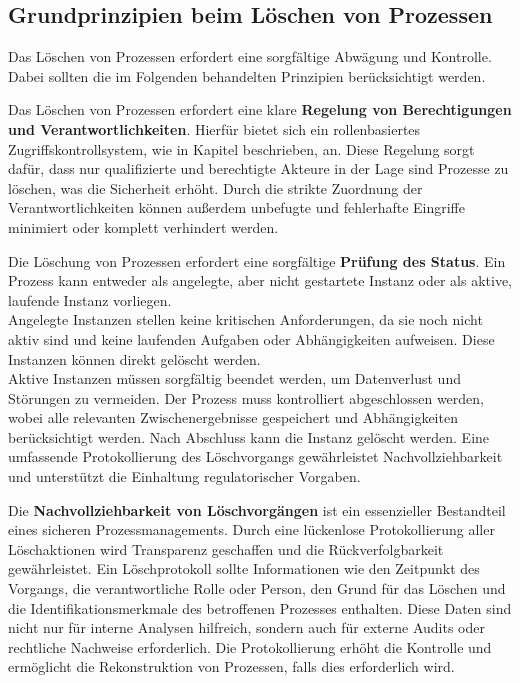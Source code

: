 \subsection*{Grundprinzipien beim Löschen von Prozessen}
Das Löschen von Prozessen erfordert eine sorgfältige Abwägung und Kontrolle. Dabei sollten die im Folgenden behandelten Prinzipien berücksichtigt werden.

Das Löschen von Prozessen erfordert eine klare \textbf{Regelung von Berechtigungen und Verantwortlichkeiten}. Hierfür bietet sich ein rollenbasiertes Zugriffskontrollsystem, wie in Kapitel  beschrieben, an. Diese Regelung sorgt dafür, dass nur qualifizierte und berechtigte Akteure in der Lage sind Prozesse zu löschen, was die Sicherheit erhöht. Durch die strikte Zuordnung der Verantwortlichkeiten können außerdem unbefugte und fehlerhafte Eingriffe minimiert oder komplett verhindert werden.

Die Löschung von Prozessen erfordert eine sorgfältige \textbf{Prüfung des Status}. Ein Prozess kann entweder als angelegte, aber nicht gestartete Instanz oder als aktive, laufende Instanz vorliegen.\\
Angelegte Instanzen stellen keine kritischen Anforderungen, da sie noch nicht aktiv sind und keine laufenden Aufgaben oder Abhängigkeiten aufweisen. Diese Instanzen können direkt gelöscht werden.\\
Aktive Instanzen müssen sorgfältig beendet werden, um Datenverlust und Störungen zu vermeiden. Der Prozess muss kontrolliert abgeschlossen werden, wobei alle relevanten Zwischenergebnisse gespeichert und Abhängigkeiten berücksichtigt werden. Nach Abschluss kann die Instanz gelöscht werden. Eine umfassende Protokollierung des Löschvorgangs gewährleistet Nachvollziehbarkeit und unterstützt die Einhaltung regulatorischer Vorgaben.

Die \textbf{Nachvollziehbarkeit von Löschvorgängen} ist ein essenzieller Bestandteil eines sicheren Prozessmanagements. Durch eine lückenlose Protokollierung aller Löschaktionen wird Transparenz geschaffen und die Rückverfolgbarkeit gewährleistet. Ein Löschprotokoll sollte Informationen wie den Zeitpunkt des Vorgangs, die verantwortliche Rolle oder Person, den Grund für das Löschen und die Identifikationsmerkmale des betroffenen Prozesses enthalten. Diese Daten sind nicht nur für interne Analysen hilfreich, sondern auch für externe Audits oder rechtliche Nachweise erforderlich. Die Protokollierung erhöht die Kontrolle und ermöglicht die Rekonstruktion von Prozessen, falls dies erforderlich wird.

